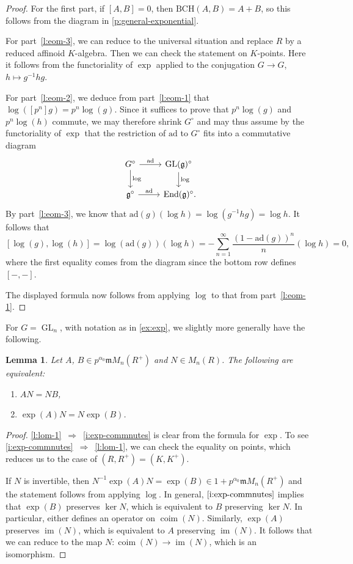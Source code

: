 \documentclass[11pt]{amsart}
\numberwithin{equation}{section}
\newtheorem{Lemma}[thm]{Lemma}
\theoremstyle{definition}
\theoremstyle{remark}
\newcommand{\m}{\mathfrak{m}}
\newcommand{\im}{\operatorname{im}}
\newcommand{\End}{\operatorname{End}}
\newcommand{\GL}{\operatorname{GL}}
\newcommand{\ad}{\mathrm{ad}}
\newcommand{\coim}{\operatorname{coim}}
\begin{document}
\begin{proof}
	For the first part, if $[A,B]=0$, then $\mathrm{BCH}(A,B)=A+B$, so this follows from the diagram in \cref{p:general-exponential}.
	
	For part~\eqref{l:eom-3}, we can reduce to the universal situation and replace $R$ by a reduced affinoid $K$-algebra. Then we can check the statement on $K$-points. Here it follows from the functoriality of $\exp$ applied to the conjugation $G\to G$, $h\mapsto g^{-1}hg$.
	
	For part~\eqref{l:eom-2}, we deduce from part~\eqref{l:eom-1} that $\log([p^n]g)=p^n\log(g)$. Since it suffices to prove that $p^n\log(g)$ and $p^n\log(h)$ commute, we may therefore shrink $G^\circ$ and may thus assume by the functoriality of $\exp$ that the restriction of $\ad$ to $G^\circ$ fits into a commutative diagram
	\[\begin{tikzcd}
		G^\circ \arrow[r, "\ad"] \arrow[d, "\log"] & \GL(\mathfrak g)^\circ \arrow[d, "\log"] \\
		\mathfrak g^\circ \arrow[r, "\ad"] & \End(\mathfrak g)^\circ\rlap{.}
	\end{tikzcd}\]
	By part~\eqref{l:eom-3}, we know that $\ad(g)(\log h)=\log(g^{-1}hg)=\log h$. It follows that
	\[ [\log(g),\log(h)]=\log(\ad(g))(\log h)=-\sum_{n=1}^\infty\frac{(1-\ad(g))^n}{n}(\log h)=0,\]
	where the first equality comes from the diagram since the bottom row defines $[-,-]$.
	
	The displayed formula now follows from applying $\log $ to that from part~\eqref{l:eom-1}.
\end{proof}

For $G=\GL_n$, with notation as in \cref{ex:exp}, we slightly more generally have the following. 

\begin{Lemma}\label{l:log-on-matrix}
  Let $A$, $B\in p^{\alpha_0}\m M_n(R^+)$ and $N\in M_n(R)$. The following are equivalent:
  
		\begin{enumerate}
			\item\label{l:lom-1} $AN=NB$, 
			\item \label{i:exp-commnutes}$\exp(A)N=N\exp(B)$.
		\end{enumerate}
\end{Lemma}

\begin{proof}
\eqref{l:lom-1}~$\Rightarrow$~\eqref{i:exp-commnutes} is clear from the formula for $\exp$.  To see \eqref{i:exp-commnutes}~$\Rightarrow$~\eqref{l:lom-1}, we can check the equality on points, which reduces us to the case of $(R,R^+)=(K,K^+)$.
	
	If $N$ is invertible, then $N^{-1}\exp(A)N=\exp(B)\in 1+p^{\alpha_0}\m M_n(R^+)$ and the statement follows from applying $\log$.
	In general,  $\eqref{i:exp-commnutes}$ implies that $\exp(B)$ preserves $\ker N$, which is equivalent to $B$ preserving $\ker N$. In particular, either defines an operator on $\coim(N)$. Similarly, $\exp(A)$ preserves $\im(N)$, which is equivalent to $A$ preserving $\im(N)$. It follows that we can reduce to the  map $N\colon \coim(N)\to \im(N)$, which is an isomorphism.
\end{proof}
\end{document}
